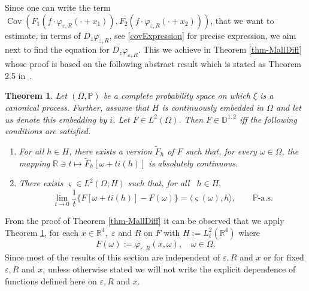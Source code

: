 \documentclass{article}
\newcommand{\assign}{:=}
\newcommand{\tmop}[1]{\ensuremath{\operatorname{#1}}}
\newtheorem{theorem}{Theorem}
\begin{document}
%
Since one can write the term $\tmop{Cov} (F_1 (f \cdot \varphi_{\varepsilon,
R} (\cdot + x_1)), F_2 (f \cdot \varphi_{\varepsilon, R} (\cdot + x_2)))$,
that we want to estimate, in terms of $D_z \varphi_{\varepsilon, R}$, see
\eqref{covExpression} for precise expression, we aim next to find the equation
for $D_z \varphi_{\varepsilon, R}$. This we achieve in Theorem
\ref{thm-MallDiff} whose proof is based on the following abstract result which
is stated as Theorem 2.5 in~{\cite{Tindel98}}.
%
\begin{theorem}
  \label{thm-MallavinDiffAbstract}Let $(\Omega, \mathbb{P})$ be a complete probability space on which $\xi$ is a canonical process. Further, assume that  $H$ is continuously embedded in $\Omega$ and let us denote
  this embedding by $i$. Let $F \in L^2 (\Omega)$. Then $F \in \mathbb{D}^{1,
  2}$ iff the following conditions are satisfied.
  \begin{enumerate}
    \item For all $h \in H$, there exists a version $\tilde{F}_h$ of $F$ such
    that, for every $\omega \in \Omega$, the mapping $\mathbb{R} \ni t \mapsto
    \tilde{F}_h [\omega + t i (h)]$ is absolutely continuous.
    
    \item There exists $\varsigma \in L^2 (\Omega ; H)$ such that, for all \
    $h \in H,$
    \begin{equation}
        \lim_{t \rightarrow 0} \frac{1}{t} \{ F [\omega + t i (h)] - F
         (\omega) \} = \langle \varsigma (\omega), h \rangle, \qquad
         \mathbb{P} \textrm{-a.s.}
    \end{equation}
  \end{enumerate}
\end{theorem}
%
From the proof of Theorem \ref{thm-MallDiff} it can be observed that we apply
Theorem \ref{thm-MallavinDiffAbstract}, for each $x \in \mathbb{R}^4,$
$\varepsilon$ and $R$ on $F$ with $H \assign L_{\ell}^2 (\mathbb{R}^4)$ where
\begin{equation} \label{defn-F}
    F (\omega) \assign \varphi_{\varepsilon, R} (x, \omega), \quad \omega \in \Omega .
\end{equation}
Since most of the results of this section are independent of $\varepsilon, R$
and $x$ or for fixed $\varepsilon, R$ and $x$, unless otherwise stated we will
not write the explicit dependence of functions defined here on $\varepsilon,
R$ and $x$.
\end{document}
